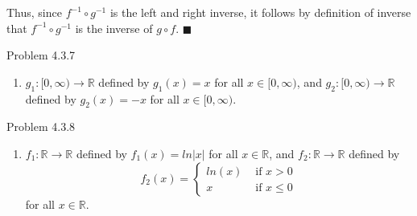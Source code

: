 \documentclass{article}
\theoremstyle{definition}
\newcommand{\R}{\mathbb{R}}
\begin{document}
	Thus, since $f^{-1}\circ g^{-1}$ is the left and right inverse, it
	follows by definition of inverse that $f^{-1}\circ g^{-1}$ is the
	inverse of $g\circ f$. $\blacksquare$

	\vspace{1cm}



	\noindent Problem 4.3.7  \vspace{0.3cm}

	\begin{enumerate}
		\item[1]  $g_1:[0,\infty)\rightarrow \R$ defined by $g_1(x)=x$ for all $x\in [0,\infty)$, and
		$g_2:[0,\infty)\rightarrow \R$ defined by $g_2(x)=-x$ for all $x\in
		[0,\infty)$.
	\end{enumerate}

	\vspace{1cm}


	\noindent Problem 4.3.8  \vspace{0.3cm}

	\begin{enumerate}
		\item[2] $f_1:\R\rightarrow \R$ defined by $f_1(x)=ln|x|$ for all
		$x\in \R$, and $f_2:\R\rightarrow \R$ defined by
		$$f_2(x)=\left\{\begin{array}{cc}
							ln(x) & \mbox{ if } x>0\\ x &
							\mbox{ if }x\le 0
		\end{array}\right.$$ for all $x\in \R$.
	\end{enumerate}

	\vspace{1cm}


\end{document}
